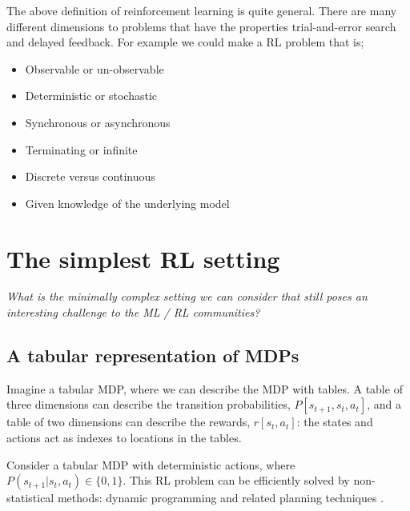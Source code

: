 
The above definition of reinforcement learning is quite general. There are many
different dimensions to problems that have the properties trial-and-error search and
delayed feedback. For example we could make a RL problem that is;

\begin{itemize}
\tightlist
\item
  Observable or un-observable
\item
  Deterministic or stochastic
\item
  Synchronous or asynchronous
\item
  Terminating or infinite
\item
  Discrete versus continuous
\item
  Given knowledge of the underlying model
\end{itemize}




\section{The simplest RL setting}

\begin{displayquote}
  \textit{What is the minimally complex setting we can consider that still poses an
  interesting challenge to the ML / RL communities?}
\end{displayquote}

\hypertarget{a-tabular-representation-of-mdps}{%
\subsection{A tabular representation of MDPs}\label{a-tabular-representation-of-mdps}}

Imagine a tabular MDP, where we can describe the MDP with tables.
A table of three dimensions can describe the transition probabilities, $P[s_{t+1}, s_t, a_t]$,
and a table of two dimensions can describe the rewards, $r[s_t, a_t]$: the states and actions
act as indexes to locations in the tables.

Consider a tabular MDP with deterministic actions, where $P(s_{t+1}|s_t, a_t) \in \{ 0, 1\}$.
This RL problem can be efficiently solved by non-statistical
methods: dynamic programming and related planning techniques \cite{Bertsekas1995}.

